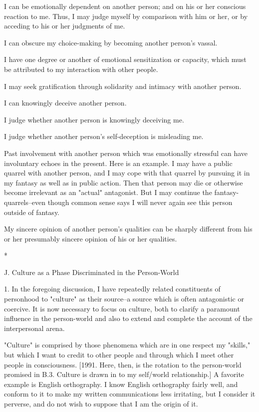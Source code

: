 I can be emotionally dependent on another person; and on his or her conscious reaction to me. Thus, I may judge myself by comparison with him or her, or by acceding to his or her judgments of me.

I can obscure my choice-making by becoming another person's vassal.

I have one degree or another of emotional sensitization or capacity, which must be attributed to my interaction with other people.

I may seek gratification through solidarity and intimacy with another person.

I can knowingly deceive another person.

I judge whether another person is knowingly deceiving me.

I judge whether another person's self-deception is misleading me.

Past involvement with another person which was emotionally stressful can have involuntary echoes in the present. Here is an example. I may have a public quarrel with another person, and I may cope with that quarrel by pursuing it in my fantasy as well as in public action. Then that person may die or otherwise become irrelevant as an "actual" antagonist. But I may continue the fantasy-quarrels--even though common sense says I will never again see this person outside of fantasy.

My sincere opinion of another person's qualities can be sharply different from his or her presumably sincere opinion of his or her qualities.

*

J. Culture as a Phase Discriminated in the Person-World

1. In the foregoing discussion, I have repeatedly related constituents of personhood to "culture" as their source--a source which is often antagonistic or coercive. It is now necessary to focus on culture, both to clarify a paramount influence in the person-world and also to extend and complete the account of the interpersonal arena.

"Culture" is comprised by those phenomena which are in one respect my "skills," but which I want to credit to other people and through which I meet other people in consciousness. [1991. Here, then, is the rotation to the person-world promised in B.3. Culture is drawn in to my self/world relationship.] A favorite example is English orthography. I know English orthography fairly well, and conform to it to make my written communications less irritating, but I consider it perverse, and do not wish to suppose that I am the origin of it.

